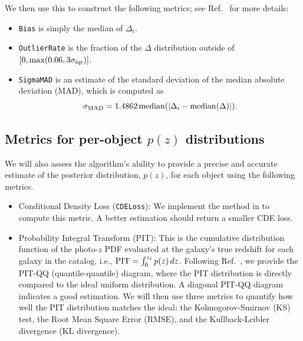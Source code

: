\documentclass[11pt,twoside,letterpaper,onecolumn,english]{article}
\begin{document}
We then use this to construct the following metrics; see
Ref.~\cite{therailteam2025} for more details:

\begin{itemize}
    \item \texttt{Bias} is simply the median of $\Delta_i$.
    \item \texttt{OutlierRate} is the fraction of the $\Delta$ distribution
      outside of $[0, {\rm max}(0.06, 3\sigma_{\rm iqr})]$.
    \item \texttt{SigmaMAD} is an estimate of the standard deviation of
      the median absolute deviation (MAD), which is computed as      
    \begin{equation}
    {\sigma_{\rm MAD}} = 1.4862\,{\rm median}(|\Delta_i - {\rm median}(\Delta)|).
    \end{equation}
\end{itemize}


\subsection{\texorpdfstring{Metrics for per-object $p(z)$ distributions}{Metrics for per-object p(z) distributions}}

We will also assess the algorithm's ability to provide a precise and
accurate estimate of the posterior distribution, $p(z)$, for each
object using the following metrics.

\begin{itemize}
    \item{Conditional Density Loss (\texttt{CDELoss}): We implement
      the method in \cite{2017arXiv170408095I} to compute this metric.
      A better estimation should return a smaller CDE loss.}
    \item{Probability Integral Transform (PIT): This is the
        cumulative distribution function of the photo-$z$ PDF evaluated
        at the galaxy's true redshift for each galaxy in the catalog,
        i.e., ${\rm PIT} = \int_{0}^{z_t} p(z)\, dz$.
      Following Ref.~\cite{schmidt_evaluation_2020}, we provide the PIT-QQ
      (quantile-quantile) diagram, where the PIT distribution is
      directly compared to the ideal uniform distribution. 
      A diagonal PIT-QQ diagram indicates a good estimation.          
      We will then use three metrics to quantify how well the PIT
      distribution matches the ideal: the Kolmogorov-Smirnov (KS)
      test, the Root Mean Square Error (RMSE), and the
      Kullback-Leibler divergence (KL divergence).}
\end{itemize}
\end{document}

